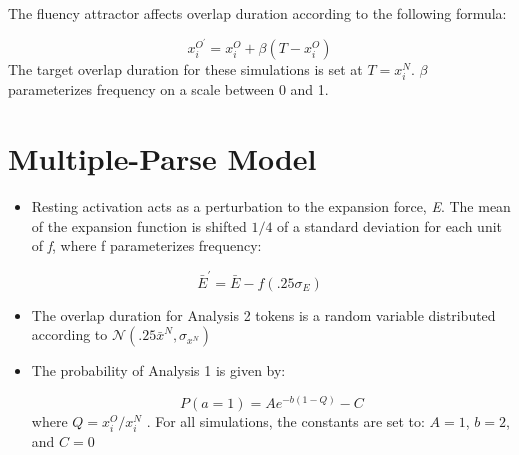 The fluency attractor affects overlap duration according to the following
formula:

\begin{equation}
x_{i}^{O^{\prime}}=x_{i}^{O}+\beta(T-x_{i}^{O})\label{eq:Frequency attractor-1}
\end{equation}
The target overlap duration for these simulations is set at $T=x_{i}^{N}$.
$\beta$ parameterizes frequency on a scale between 0 and 1. 

\section{Multiple-Parse Model}
\begin{itemize}
\item Resting activation acts as a perturbation to the expansion force,
\emph{E}. The mean of the expansion function is shifted ${1}/{4}$
of a standard deviation for each unit of \emph{f}, where f parameterizes
frequency:
\end{itemize}
\[
\bar{E}^{\prime}=\bar{E}-f(.25\sigma_{E})
\]

\begin{itemize}
\item The overlap duration for Analysis 2 tokens is a random variable distributed
according to $\mathcal{\mathscr{N}}\left(.25\bar{x}^{N},\sigma_{x^{N}}\right)$
\item The probability of Analysis 1 is given by:

\begin{equation}
P(a=1)=Ae^{-b(1-Q)}-C\label{eq:segmentation-1-1}
\end{equation}
where $Q={x_{i}^{O}}/{x_{i}^{N}}$\emph{ }. For all simulations,
the constants are set to: $A=1$, $b=2$, and $C=0$
\end{itemize}

